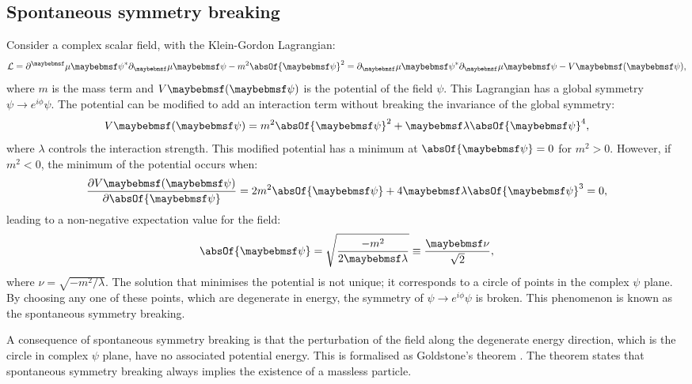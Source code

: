 
\subsection{Spontaneous symmetry breaking}

Consider a complex scalar field, with the Klein-Gordon Lagrangian:
\begin{equation}
\Lagr = \partial^\mu{\psi}^*\partial_\mu\psi - m^2 \absOf{\psi}^2 =  \partial_\mu{\psi}^*\partial_\mu\psi - V\parenths{\psi} ,
\label{eq:theoryKGLagrangian}
\end{equation}
where $m$ is the mass term and $V\parenths{\psi} $ is the potential of the field $\psi$. This Lagrangian has a global symmetry $\psi \to e^{i\phi}\psi$. The potential can be modified to add an interaction term without breaking the  invariance of the global symmetry:
\begin{equation}
V\parenths{\psi} =  m^2 \absOf{\psi}^2 + \lambda\absOf{\psi}^4,
\end{equation}
where $\lambda$ controls the interaction strength. This modified potential has a minimum at $ \absOf{\psi}=0$ for $m^2>0$. However, if $m^2<0$, the minimum of the potential occurs when:
\begin{equation}
\frac{\partial{V}\parenths{\psi}}{\partial{\absOf{\psi}}} =  2 m^2 \absOf{\psi} + 4\lambda\absOf{\psi}^3 = 0,
\end{equation}
leading to a non-negative expectation value for the field:
\begin{equation}
\absOf{\psi} = \sqrt{\frac{-m^2}{2\lambda}}\equiv \frac{\nu}{\sqrt{2}},
\end{equation}
where $\nu = \sqrt{-m^2/\lambda}$. The solution that minimises the potential is not unique; it corresponds to a circle of points in the complex $\psi$ plane. By choosing any one of these points, which are degenerate in energy, the symmetry of   $\psi \to e^{i\phi}\psi$ is broken. This phenomenon is known as the spontaneous symmetry breaking.

A consequence of  spontaneous symmetry breaking is that the perturbation of the field along the degenerate energy direction, which is the circle in complex $\psi$ plane, have no associated potential energy. This is formalised as Goldstone's theorem \cite{Nambu:1960tm,Goldstone:1961eq}. The theorem states that spontaneous symmetry breaking always implies the existence of a massless particle.

